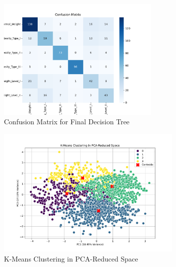 
\begin{figure}[htbp]
    \centering
    \includegraphics[width=0.7\textwidth]{confusion_matrix.pdf}
    \caption{Confusion Matrix for Final Decision Tree}
    \label{fig:confusion_matrix}
\end{figure}

\begin{figure}[!h]
    \centering
    \includegraphics[width=0.8\textwidth]{kmeans_pca_reduced.pdf}
    \caption{K-Means Clustering in PCA-Reduced Space}
    \label{fig:kmeans_pca}
\end{figure}



